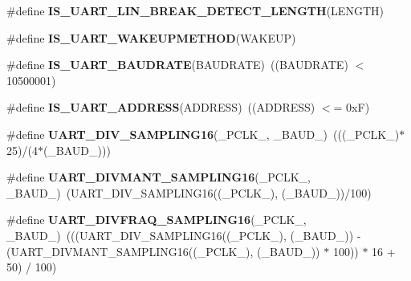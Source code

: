 \begin{DoxyCompactItemize}
\item 
\#define {\bfseries I\+S\+\_\+\+U\+A\+R\+T\+\_\+\+L\+I\+N\+\_\+\+B\+R\+E\+A\+K\+\_\+\+D\+E\+T\+E\+C\+T\+\_\+\+L\+E\+N\+G\+TH}(L\+E\+N\+G\+TH)
\item 
\#define {\bfseries I\+S\+\_\+\+U\+A\+R\+T\+\_\+\+W\+A\+K\+E\+U\+P\+M\+E\+T\+H\+OD}(W\+A\+K\+E\+UP)
\item 
\#define {\bfseries I\+S\+\_\+\+U\+A\+R\+T\+\_\+\+B\+A\+U\+D\+R\+A\+TE}(B\+A\+U\+D\+R\+A\+TE)~((B\+A\+U\+D\+R\+A\+TE) $<$ 10500001)\hypertarget{group___u_a_r_t___private___macros_ga5d657d5c8e47b147a834e0018e9407c2}{}\label{group___u_a_r_t___private___macros_ga5d657d5c8e47b147a834e0018e9407c2}

\item 
\#define {\bfseries I\+S\+\_\+\+U\+A\+R\+T\+\_\+\+A\+D\+D\+R\+E\+SS}(A\+D\+D\+R\+E\+SS)~((A\+D\+D\+R\+E\+SS) $<$= 0x\+F)\hypertarget{group___u_a_r_t___private___macros_ga2c4dce8c60f202455e6f1481fc441f98}{}\label{group___u_a_r_t___private___macros_ga2c4dce8c60f202455e6f1481fc441f98}

\item 
\#define {\bfseries U\+A\+R\+T\+\_\+\+D\+I\+V\+\_\+\+S\+A\+M\+P\+L\+I\+N\+G16}(\+\_\+\+P\+C\+L\+K\+\_\+,  \+\_\+\+B\+A\+U\+D\+\_\+)~(((\+\_\+\+P\+C\+L\+K\+\_\+)$\ast$25)/(4$\ast$(\+\_\+\+B\+A\+U\+D\+\_\+)))\hypertarget{group___u_a_r_t___private___macros_gabd6dd99fff6cd5c0374780fd72a61e6e}{}\label{group___u_a_r_t___private___macros_gabd6dd99fff6cd5c0374780fd72a61e6e}

\item 
\#define {\bfseries U\+A\+R\+T\+\_\+\+D\+I\+V\+M\+A\+N\+T\+\_\+\+S\+A\+M\+P\+L\+I\+N\+G16}(\+\_\+\+P\+C\+L\+K\+\_\+,  \+\_\+\+B\+A\+U\+D\+\_\+)~(U\+A\+R\+T\+\_\+\+D\+I\+V\+\_\+\+S\+A\+M\+P\+L\+I\+N\+G16((\+\_\+\+P\+C\+L\+K\+\_\+), (\+\_\+\+B\+A\+U\+D\+\_\+))/100)\hypertarget{group___u_a_r_t___private___macros_ga9cd479aff25c454d9d4f3c1c20517c86}{}\label{group___u_a_r_t___private___macros_ga9cd479aff25c454d9d4f3c1c20517c86}

\item 
\#define {\bfseries U\+A\+R\+T\+\_\+\+D\+I\+V\+F\+R\+A\+Q\+\_\+\+S\+A\+M\+P\+L\+I\+N\+G16}(\+\_\+\+P\+C\+L\+K\+\_\+,  \+\_\+\+B\+A\+U\+D\+\_\+)~(((U\+A\+R\+T\+\_\+\+D\+I\+V\+\_\+\+S\+A\+M\+P\+L\+I\+N\+G16((\+\_\+\+P\+C\+L\+K\+\_\+), (\+\_\+\+B\+A\+U\+D\+\_\+)) -\/ (U\+A\+R\+T\+\_\+\+D\+I\+V\+M\+A\+N\+T\+\_\+\+S\+A\+M\+P\+L\+I\+N\+G16((\+\_\+\+P\+C\+L\+K\+\_\+), (\+\_\+\+B\+A\+U\+D\+\_\+)) $\ast$ 100)) $\ast$ 16 + 50) / 100)\hypertarget{group___u_a_r_t___private___macros_gade99ebfd7502df11b366c48fac5417d7}{}\label{group___u_a_r_t___private___macros_gade99ebfd7502df11b366c48fac5417d7}


\end{DoxyCompactItemize}
